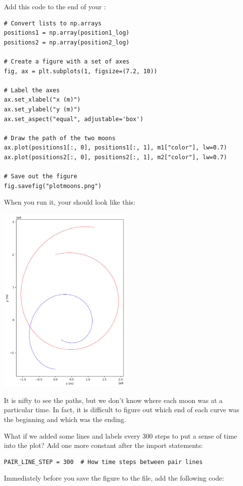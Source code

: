 Add this code to the end of your :

\begin{verbatim}
# Convert lists to np.arrays
positions1 = np.array(position1_log)
positions2 = np.array(position2_log)

# Create a figure with a set of axes
fig, ax = plt.subplots(1, figsize=(7.2, 10))

# Label the axes
ax.set_xlabel("x (m)")
ax.set_ylabel("y (m)")
ax.set_aspect("equal", adjustable='box')

# Draw the path of the two moons
ax.plot(positions1[:, 0], positions1[:, 1], m1["color"], lw=0.7)
ax.plot(positions2[:, 0], positions2[:, 1], m2["color"], lw=0.7)

# Save out the figure
fig.savefig("plotmoons.png")
\end{verbatim}

When you run it,   your  should look like this:

\includegraphics[width=0.5\textwidth]{plotmoons_01.png}

It is nifty to see the paths,  but we don't know where each moon was at a particular time.  In fact, it is difficult to figure out which end of each curve was the beginning and which was the ending.

What if we added some lines and labels every 300 steps to put a sense of time into the plot?  Add one more constant after the import statements:
\begin{verbatim}
PAIR_LINE_STEP = 300  # How time steps between pair lines
\end{verbatim}


Immediately before you
save the figure to the file,  add the following code:


